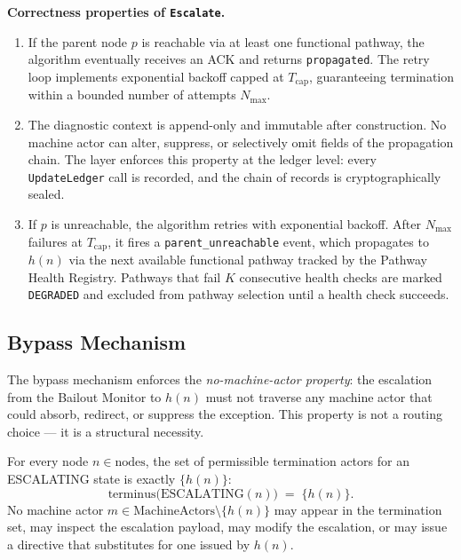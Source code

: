 \bigskip
\noindent\textbf{Correctness properties of \texttt{Escalate}.}

\begin{enumerate}
\item[\emph{Progress.}] If the parent node $p$ is reachable via at least one functional pathway, the algorithm eventually receives an ACK and returns \texttt{propagated}. The retry loop implements exponential backoff capped at $T_{\text{cap}}$, guaranteeing termination within a bounded number of attempts $N_{\max}$.

\item[\emph{Integrity.}] The diagnostic context is append-only and immutable after construction. No machine actor can alter, suppress, or selectively omit fields of the propagation chain. The \fact{} layer enforces this property at the ledger level: every \texttt{UpdateLedger} call is recorded, and the chain of records is cryptographically sealed.

\item[\emph{Liveness under pathway degradation.}] If $p$ is unreachable, the algorithm retries with exponential backoff. After $N_{\max}$ failures at $T_{\text{cap}}$, it fires a \texttt{parent\_unreachable} event, which propagates to $h(n)$ via the next available functional pathway tracked by the Pathway Health Registry. Pathways that fail $K$ consecutive health checks are marked \texttt{DEGRADED} and excluded from pathway selection until a health check succeeds.
\end{enumerate}

\subsection{Bypass Mechanism}\label{sec:bypass-mechanism}

The bypass mechanism enforces the \emph{no-machine-actor property}: the escalation from the Bailout Monitor to $h(n)$ must not traverse any machine actor that could absorb, redirect, or suppress the exception. This property is not a routing choice — it is a structural necessity.

\begin{definition}\label{def:bypass}
For every node $n \in \text{nodes}$, the set of permissible termination actors for an ESCALATING state is exactly $\{h(n)\}$:
\begin{equation}
\text{terminus}\bigl(\text{ESCALATING}(n)\bigr) \;=\; \{h(n)\}. \tag{BP}
\end{equation}
No machine actor $m \in \text{MachineActors} \setminus \{h(n)\}$ may appear in the termination set, may inspect the escalation payload, may modify the escalation, or may issue a directive that substitutes for one issued by $h(n)$.
\end{definition}

